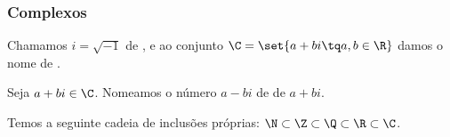 \begin{frame}
\frametitle{Complexos} %
\begin{definicao}
Chamamos $i = \sqrt {-1}$ de , e ao conjunto
$\C = \set{ a+bi \tq a,b \in \R}$ damos o nome de .
\end{definicao}

Seja $a+bi \in \C$. Nomeamos o número $a-bi$ de  de
$a+bi$.

Temos a seguinte cadeia de inclusões próprias: $\N \subset \Z
\subset \Q \subset \R \subset \C$.
\end{frame}



